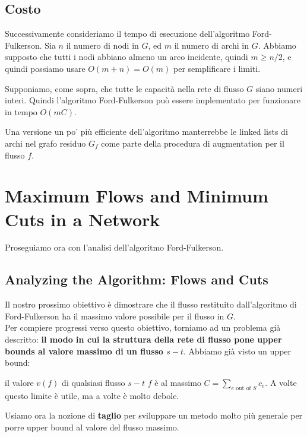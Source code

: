 \subsection{Costo}

Successivamente consideriamo il tempo di esecuzione dell'algoritmo
Ford-Fulkerson. Sia $n$ il numero di nodi in $G$, ed $m$ il numero
di archi in $G$. Abbiamo supposto che tutti i nodi abbiano almeno un
arco incidente, quindi $m \ge n/2$, e quindi possiamo usare
$O(m + n ) = O(m)$ per semplificare i limiti.

\begin{myblockquote}
  Supponiamo, come sopra, che tutte le capacità nella rete di flusso $G$
  siano numeri interi. Quindi l'algoritmo Ford-Fulkerson può essere
  implementato per funzionare in tempo $O(mC)$.
\end{myblockquote}

Una versione un po' più efficiente dell'algoritmo manterrebbe le linked
lists di archi nel grafo residuo $G_f$ come parte della procedura di
augmentation per il flusso $f$.


\section{Maximum Flows and Minimum Cuts in a Network}

Proseguiamo ora con l'analisi dell'algoritmo Ford-Fulkerson.


\subsection{Analyzing the Algorithm: Flows and Cuts}

Il nostro prossimo obiettivo è dimostrare che il flusso restituito
dall'algoritmo di Ford-Fulkerson ha il massimo valore possibile per il
flusso in $G$.\\

Per compiere progressi verso questo obiettivo, torniamo ad un problema
già descritto: \textbf{il modo in cui la struttura della rete di flusso
  pone upper bounds al valore massimo di un flusso $s-t$}. Abbiamo già
visto un upper bound:

\begin{myblockquote}
  il valore $v(f)$ di qualsiasi
  flusso $s-t$ $f$ è al massimo
  $C = \sum_{e \text{ out of } S} c_e$. A volte questo limite è utile,
  ma a volte è molto debole.
\end{myblockquote}

Usiamo ora la nozione di \textbf{taglio} per sviluppare un metodo molto
più generale per porre upper bound al valore del flusso massimo.


